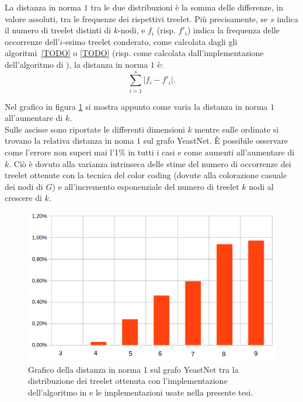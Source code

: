La distanza in norma $1$ tra le due distribuzioni è la somma delle differenze, in valore assoluti, tra le frequenze dei rispettivi treelet.
Più precisamente, se $s$ indica il numero di treelet distinti di $k$-nodi, e $f_i$ (risp. $f'_i$) indica la frequenza delle occorrenze dell'$i$-esimo treelet  conderato, come calcolata dagli gli algoritmi~\ref{TODO} o \ref{TODO} (risp. come calcolata dall'implementazione dell'algoritmo di \cite{TODO}), la distanza in norma $1$ è:
\[
	\sum_{i=1}^{s}{\left| f_i - f'_i \right| }.
\]


Nel grafico in figura \ref{ERROR} si mostra appunto come varia la distanza in norma $1$ all'aumentare di $ k $.\\
Sulle ascisse sono riportate le differenti dimensioni $ k $ mentre sulle ordinate si trovano la relativa distanza in noma $1$ sul grafo YeastNet.
È possibile osservare come l'errore non superi mai l'1\% in tutti i casi e come aumenti all'aumentare di $k$. 
Ciò è dovuto alla varianza intrinseca delle stime del numero di occorrenze dei treelet ottenute con la tecnica del color coding (dovute alla colorazione casuale dei nodi di $G$) e all'incremento esponenziale del numero di treelet $k$ nodi al crescere di $k$.
 

\begin{figure}[htbp]
	\includegraphics[width=15.4cm]{capitolo4/grafoErrorel1}
	\caption{Grafico della distanza in norma 1 sul grafo YeastNet tra la distribuzione dei treelet ottenuta con l'implementazione dell'algoritmo in \cite{bressan2019motivo} e le implementazioni usate nella presente tesi.}
	\label{ERROR}
\end{figure}


